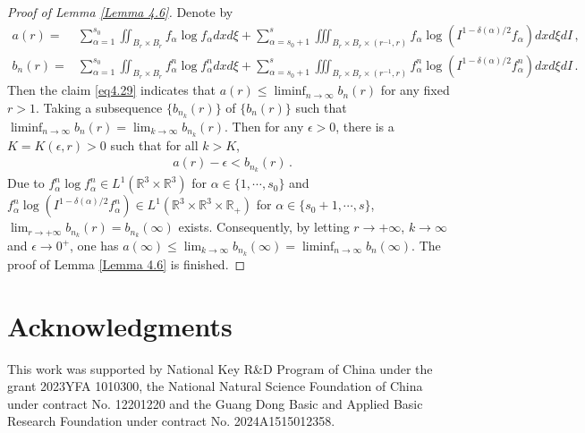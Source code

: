\documentclass[reqno,11pt]{amsart}
\numberwithin{equation}{section}
\def\R{\mathbb{R}}
\begin{document}
\begin{proof}[Proof of Lemma \ref{Lemma 4.6}]
Denote by 
  \begin{align*}
    a (r) = & \sum_{\alpha = 1}^{s_0} \iint_{B_r \times B_r} f_\alpha \log f_\alpha dxd\xi + \sum_{\alpha = s_0 + 1}^{s} \iiint_{B_r \times B_r \times (r^{-1}, r) } f_\alpha \log (I^{1-\delta(\alpha )/2 } f_\alpha) dxd\xi dI \,, \\
    b_n (r) = & \sum_{\alpha = 1}^{s_0} \iint_{B_r \times B_r } f^n_\alpha \log f^n_\alpha dxd\xi + \sum_{\alpha = s_0 + 1}^{s} \iiint_{B_r \times B_r \times (r^{-1},r) } f^n_\alpha \log (I^{1-\delta(\alpha)/2}f^n_\alpha) dxd\xi dI \,.
  \end{align*}
Then the claim \eqref{eq4.29} indicates that $a (r) \leq \liminf_{n \to \infty} b_n (r)$ for any fixed $r > 1$. Taking a subsequence $\{ b_{n_k} (r) \}$ of $\{ b_n (r) \}$ such that $\liminf_{n \to \infty} b_n (r) = \lim_{k \to \infty} b_{n_k} (r)$. Then for any $\epsilon > 0$, there is a $K = K (\epsilon, r) > 0$ such that for all $k > K $,
\begin{equation*}
  \begin{aligned}
    a (r) - \epsilon < b_{n_k} (r) \,.
  \end{aligned}
\end{equation*}
Due to $f^n_\alpha \log f^n_\alpha \in L^1 (\R^3 \times \R^3)$ for $\alpha \in \{ 1, \cdots, s_0 \}$ and $f^n_\alpha \log (I^{1-\delta(\alpha)/2}f^n_\alpha) \in L^1 (\R^3 \times \R^3 \times \R_+)$ for $\alpha \in \{ s_0 + 1, \cdots, s \}$, $\lim_{r \to + \infty} b_{n_k} (r) = b_{n_k} (\infty)$ exists. Consequently, by letting $r \to + \infty$, $k \to \infty$ and $\epsilon \to 0^+$, one has $a (\infty) \leq \lim_{k \to \infty} b_{n_k} (\infty) = \liminf_{n \to \infty} b_n (\infty)$. The proof of Lemma \ref{Lemma 4.6} is finished.
\end{proof}




\section*{Acknowledgments}
This work was supported by National Key R\&D Program of China under the grant 2023YFA 1010300, the National Natural Science Foundation of China under contract No. 12201220 and the Guang Dong Basic and Applied Basic Research Foundation under contract No. 2024A1515012358.

\bigskip
\end{document}

